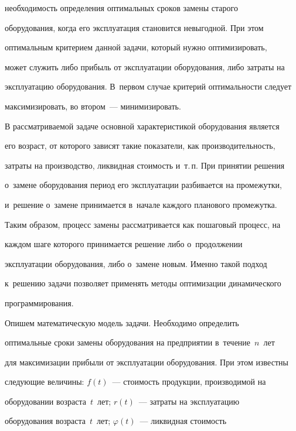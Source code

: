необходимость определения оптимальных сроков замены старого 


оборудования, когда его эксплуатация становится невыгодной. При этом 


оптимальным критерием данной задачи, который нужно оптимизировать, 


может служить либо прибыль от эксплуатации оборудования, либо затраты на 


эксплуатацию оборудования. В~первом случае критерий оптимальности следует 


максимизировать, во втором~--- минимизировать. 


  


  В рассматриваемой задаче основной характеристикой оборудования является 


его воз\-раст, от которого зависят такие показатели, как производительность, 


за\-тра\-ты на производство, ликвидная сто\-и\-мость и~т.\,п. При принятии решения 


о~замене оборудования период его эксплуатации разбивается на промежутки, 


и~решение о~замене принимается в~начале каж\-до\-го планового промежутка. 


Таким образом, процесс замены рассматривается как пошаговый процесс, на 


каждом шаге которого принимается решение либо о~продолжении 


эксплуатации оборудования, либо о~замене новым. Именно такой подход 


к~решению задачи позволяет применять методы оптимизации динамического 


программирования.


  


  Опишем математическую модель задачи. Необходимо определить 


оптимальные сроки замены оборудования на предприятии в~течение~$n$~лет 


для максимизации прибыли от эксплуатации оборудования. При этом известны 


следующие величины: $f(t)$~--- сто\-и\-мость продукции, производимой на 


оборудовании воз\-рас\-та~$t$~лет; $r(t)$~--- за\-тра\-ты на эксплуатацию 


оборудования воз\-рас\-та~$t$~лет; $\varphi(t)$~--- ликвидная сто\-и\-мость 


